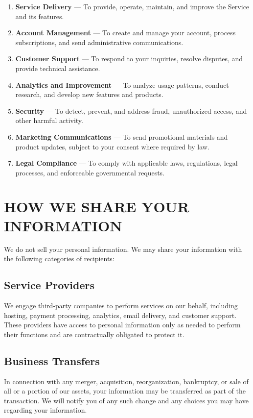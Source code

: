 \documentclass[
    language=english,
    doctype=privacy-policy,
    institution=none,
]{../../omnilatex}
\begin{document}
\begin{enumerate}
    \item \textbf{Service Delivery} --- To provide, operate, maintain, and improve the Service and its features.
    \item \textbf{Account Management} --- To create and manage your account, process subscriptions, and send administrative communications.
    \item \textbf{Customer Support} --- To respond to your inquiries, resolve disputes, and provide technical assistance.
    \item \textbf{Analytics and Improvement} --- To analyze usage patterns, conduct research, and develop new features and products.
    \item \textbf{Security} --- To detect, prevent, and address fraud, unauthorized access, and other harmful activity.
    \item \textbf{Marketing Communications} --- To send promotional materials and product updates, subject to your consent where required by law.
    \item \textbf{Legal Compliance} --- To comply with applicable laws, regulations, legal processes, and enforceable governmental requests.
\end{enumerate}

\section{HOW WE SHARE YOUR INFORMATION}

We do not sell your personal information. We may share your information with the following categories of recipients:

\subsection{Service Providers}
We engage third-party companies to perform services on our behalf, including hosting, payment processing, analytics, email delivery, and customer support. These providers have access to personal information only as needed to perform their functions and are contractually obligated to protect it.

\subsection{Business Transfers}
In connection with any merger, acquisition, reorganization, bankruptcy, or sale of all or a portion of our assets, your information may be transferred as part of the transaction. We will notify you of any such change and any choices you may have regarding your information.
\end{document}
